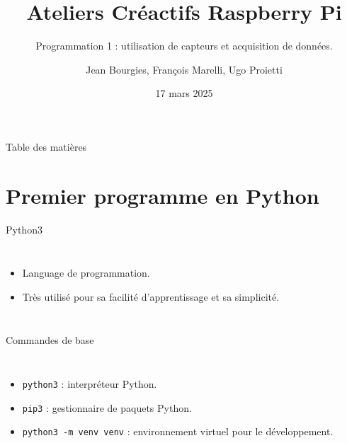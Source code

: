 \documentclass[aspectratio=169,xcolor=dvipsnames]{beamer}
\title{Ateliers Créactifs Raspberry Pi}
\subtitle{Programmation 1 : utilisation de capteurs et acquisition de données.}
\author{Jean Bourgies, François Marelli, Ugo Proietti}
\date{17 mars 2025}
\begin{document}
\begin{frame}
    \titlepage
\end{frame}

\begin{frame}{Table des matières}
    \tableofcontents
\end{frame}


\section{Premier programme en Python}

\begin{frame}{Python3}
    \begin{columns}[c] %

        \begin{itemize}
            \item Language de programmation.
            \item Très utilisé pour sa facilité d'apprentissage et sa simplicité.
        \end{itemize}

    \end{columns}
\end{frame}

\begin{frame}{Commandes de base}
    \begin{columns}[c] %

        \begin{itemize}
            \item \texttt{python3} : interpréteur Python.
            \item \texttt{pip3} : gestionnaire de paquets Python.
            \item \texttt{python3 -m venv venv} : environnement virtuel pour le développement.
        \end{itemize}

    \end{columns}
\end{frame}
\end{document}
